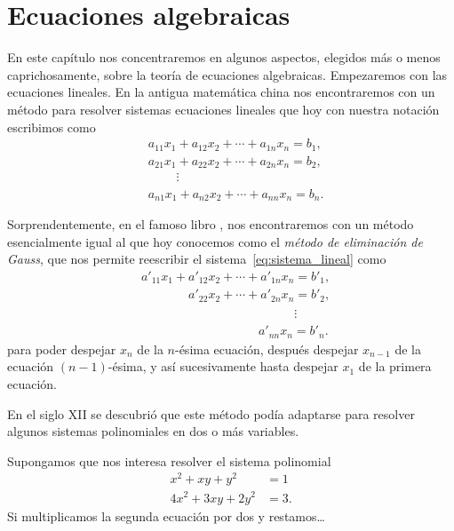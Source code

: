 \chapter{Ecuaciones algebraicas}

En este capítulo nos concentraremos en algunos aspectos, elegidos más o menos
caprichosamente, sobre la teoría de ecuaciones algebraicas.  Empezaremos con
las ecuaciones lineales. En la antigua matemática china nos encontraremos con
un método para resolver sistemas ecuaciones lineales que hoy con nuestra
notación escribimos como
\begin{equation}
\label{eq:sistema_lineal}
\begin{aligned}
	&a_{11}x_1+a_{12}x_2+\cdots+a_{1n}x_n=b_1,\\
	&a_{21}x_1+a_{22}x_2+\cdots+a_{2n}x_n=b_2,\\
	&\phantom{a_{11}x_1}\vdots\\
	&a_{n1}x_1+a_{n2}x_2+\cdots+a_{nn}x_n=b_n.
\end{aligned}
\end{equation}

Sorprendentemente, en el famoso libro , nos encontraremos con un
método esencialmente igual al que hoy conocemos como el \emph{método de
eliminación de Gauss}, que nos permite reescribir el
sistema~\eqref{eq:sistema_lineal} como
\begin{equation*}
\begin{aligned}
	&a'_{11}x_1+a'_{12}x_2+\cdots+a'_{1n}x_n=b'_1,\\
	&\phantom{a'_{21}x_1+}a'_{22}x_2+\cdots+a'_{2n}x_n=b'_2,\\
	&\phantom{a'_{11}x_1+a'_{22}x_2+\cdots+a'_{2n}x_n}\vdots\\
	&\phantom{a'_{n1}x_1+a_{n2}x_2+\cdots+}a'_{nn}x_n=b'_n.
\end{aligned}
\end{equation*}
para poder despejar $x_n$ de la $n$-ésima ecuación, después despejar 
$x_{n-1}$ de la ecuación $(n-1)$-ésima, y así sucesivamente hasta 
despejar $x_1$ de la primera ecuación. 

En el siglo XII se descubrió que este método podía adaptarse para
resolver algunos sistemas polinomiales en dos o más variables. 

\begin{example}
	Supongamos que nos interesa resolver
	el sistema polinomial
	\begin{align*}
		 x^2+xy+y^2&=1\\
		 4x^2+3xy+2y^2&=3.
	\end{align*}
	Si multiplicamos la segunda ecuación por dos y restamos\dots
\end{example}


